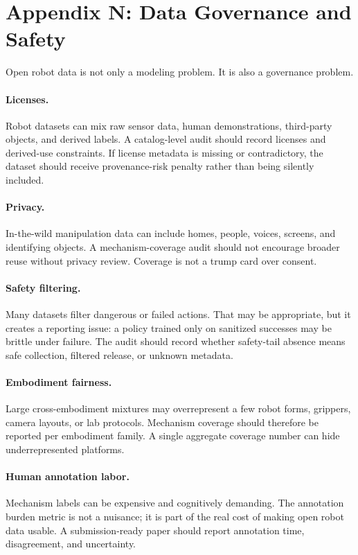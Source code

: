 \documentclass{article}
\begin{document}
\section{Appendix N: Data Governance and Safety}
Open robot data is not only a modeling problem. It is also a governance problem.

\paragraph{Licenses.}
Robot datasets can mix raw sensor data, human demonstrations, third-party objects, and derived labels. A catalog-level audit should record licenses and derived-use constraints. If license metadata is missing or contradictory, the dataset should receive provenance-risk penalty rather than being silently included.

\paragraph{Privacy.}
In-the-wild manipulation data can include homes, people, voices, screens, and identifying objects. A mechanism-coverage audit should not encourage broader reuse without privacy review. Coverage is not a trump card over consent.

\paragraph{Safety filtering.}
Many datasets filter dangerous or failed actions. That may be appropriate, but it creates a reporting issue: a policy trained only on sanitized successes may be brittle under failure. The audit should record whether safety-tail absence means safe collection, filtered release, or unknown metadata.

\paragraph{Embodiment fairness.}
Large cross-embodiment mixtures may overrepresent a few robot forms, grippers, camera layouts, or lab protocols. Mechanism coverage should therefore be reported per embodiment family. A single aggregate coverage number can hide underrepresented platforms.

\paragraph{Human annotation labor.}
Mechanism labels can be expensive and cognitively demanding. The annotation burden metric is not a nuisance; it is part of the real cost of making open robot data usable. A submission-ready paper should report annotation time, disagreement, and uncertainty.
\end{document}
